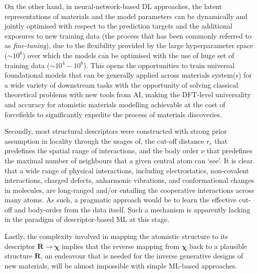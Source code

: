 On the other hand, in neural-network-based DL approaches, the latent representations of materials and the model parameters can be dynamically and jointly optimised with respect to the prediction targets and the additional exposures to new training data (the  process that has been commonly referred to as  \textit{fine-tuning}\cite{radova2025fine,bertani2025atomic,grandel2026parameter}), due to the flexibility provided by the large hyperparameter space ($\sim10^{6}$) over which the models can be optimised with the use of huge set of training data ($\sim10^{4}-10^{6}$).  This opens the opportunities to train universal foundational models that can be generally applied across materials system(s)\cite{batatia2023foundation,feng2025universal,wood2025family} for a wide variety of downstream tasks\cite{martin2025general,zhong2025machine,elena2025machine,ho2026equivariant} with the opportunity of solving classical theoretical problems with new tools from AI,\cite{goonnheimer2025beyond} making the DFT-level universality and accuracy for atomistic materials modelling achievable at the cost of forcefields to significantly expedite the process of materials discoveries.

Secondly, most structural descriptors were constructed with strong prior assumption in locality through the usages of, the cut-off distance $r_c$ that predefines the spatial range of interactions, and the body order $\nu$ that predefines the maximal number of neighbours that a given central atom can `see'. It is clear that a wide range of physical interactions, including electrostatics, non-covalent interactions,\cite{grisafi2021multi} charged defects,\cite{freysoldt2011electrostatic} anharmonic vibrations,\cite{darby2022compressing,yang2021altas} and conformational changes in molecules,\cite{frank2022so3krates} are long-ranged and/or entailing the cooperative interactions across many atoms. As such, a pragmatic approach would be to learn the effective cut-off and body-order from the data itself. Such a mechanism is apparently lacking in the paradigm of descriptor-based ML at this stage.

Lastly, the complexity involved in mapping the atomistic structure to its descriptor $\bm{R}\to\boldsymbol{\chi}$ implies that the reverse mapping from $\boldsymbol{\chi}$ back to a plausible structure $\bm{R}$, an endeavour that is needed for the inverse generative designs of new materials, will be almost impossible with simple ML-based approaches.

